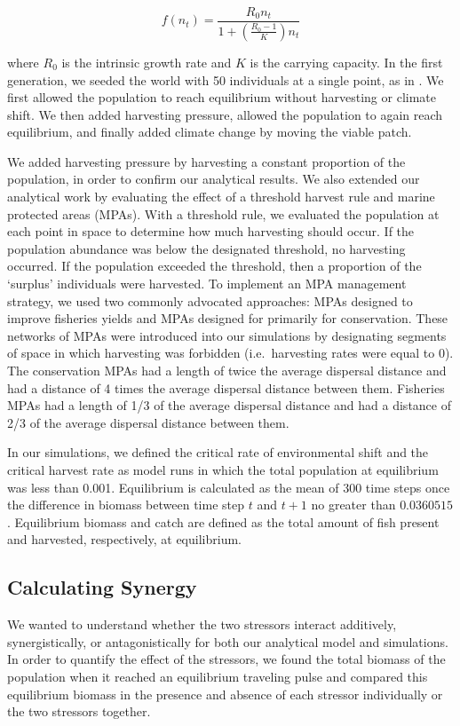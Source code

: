 \documentclass[]{article}
\begin{document}
\[f(n_t)=\frac{R_0n_t}{1+\left(\frac{R_0-1}{K}\right)n_t}\]

\noindent where $R_0$ is the intrinsic growth rate and $K$ is the carrying capacity.  In the first generation, we seeded the world with 50 individuals at a single point, as in 
\citep{ZhouKot2011}. We first allowed the population to reach equilibrium without harvesting or climate shift.  We then 
added harvesting pressure, allowed the population to again reach equilibrium, and finally added climate 
change by moving the viable patch.

We added harvesting pressure by harvesting a constant proportion of the population, in order to confirm our analytical results. 
We also extended our analytical work by evaluating the effect of a threshold harvest rule and marine protected 
areas (MPAs). With a threshold rule, we evaluated the population at each point in space to determine how 
much harvesting should occur. If the population abundance was below the designated threshold, no 
harvesting occurred. If the population exceeded the threshold, then a proportion of the `surplus' individuals 
were harvested. To implement an MPA management strategy, we used two commonly advocated approaches: 
MPAs designed to improve fisheries yields and MPAs designed for primarily for conservation. These networks 
of MPAs were introduced into our simulations by designating segments of space in which harvesting was 
forbidden (i.e.~harvesting rates were equal to $0$). The conservation MPAs had a length of twice the average 
dispersal distance and had a distance of 4 times the average dispersal distance between them. Fisheries MPAs had a length of 1/3 of the 
average dispersal distance and had a distance of 2/3 of the average dispersal distance between them.

In our simulations, we defined the critical rate of environmental shift and the critical harvest rate as model runs 
in which the total population at equilibrium was less than 0.001. Equilibrium is calculated as the mean of 300 time steps once the difference in biomass between time step $t$ and $t+1$ no greater than $0.0360515$. Equilibrium biomass and catch are defined as the total amount of fish present and harvested, respectively, at equilibrium. 

\subsection{Calculating Synergy }

We wanted to understand whether the two stressors interact 
additively, synergistically, or antagonistically \citep{Crainetal2008} for both our analytical model and simulations. In order to quantify the effect of the 
stressors, we found the total biomass of the population when it reached an equilibrium traveling pulse and 
compared this equilibrium biomass in the presence and absence of each stressor individually or the two stressors together. 
\end{document}
